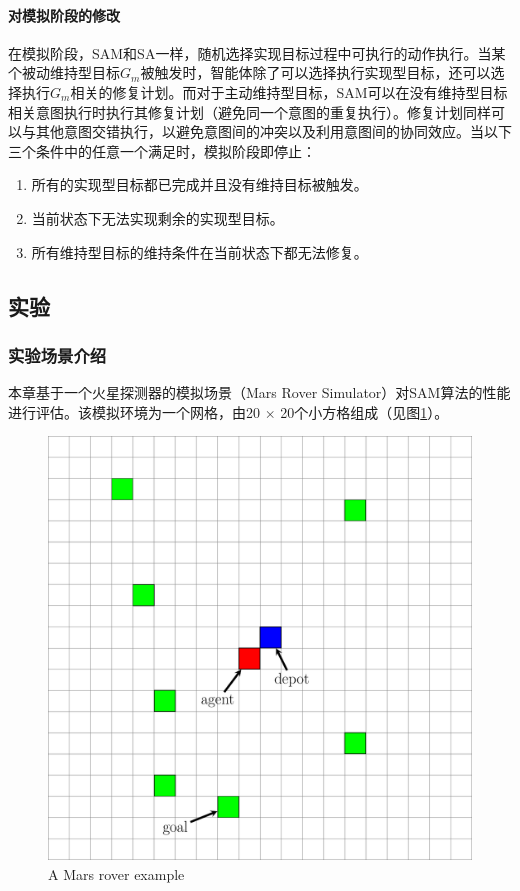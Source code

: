 \paragraph{对模拟阶段的修改}
在模拟阶段，SAM和SA一样，随机选择实现目标过程中可执行的动作执行。当某个被动维持型目标$G_m$被触发时，智能体除了可以选择执行实现型目标，还可以选择执行$G_m$相关的修复计划。而对于主动维持型目标，SAM可以在没有维持型目标相关意图执行时执行其修复计划（避免同一个意图的重复执行）。修复计划同样可以与其他意图交错执行，以避免意图间的冲突以及利用意图间的协同效应。当以下三个条件中的任意一个满足时，模拟阶段即停止：
\begin{enumerate}
  \item 所有的实现型目标都已完成并且没有维持目标被触发。
  \item 当前状态下无法实现剩余的实现型目标。
  \item 所有维持型目标的维持条件在当前状态下都无法修复。
\end{enumerate}

\subsection{实验}
\subsubsection{实验场景介绍}
本章基于一个火星探测器的模拟场景（Mars Rover Simulator）对SAM算法的性能进行评估。该模拟环境为一个网格，由20 $\times$ 20个小方格组成（见图\ref{fig:marsrover}）。
\begin{figure}[h!]
\centering
\includegraphics[scale=0.4]{./figs/mg_example}
\captionsetup{justification=centering}
\caption{A Mars rover example}
\label{fig:marsrover}
\end{figure}

